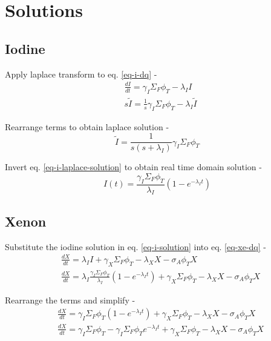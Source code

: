 \documentclass[11pt,a4paper]{article}
\begin{document}
\section{Solutions}
\subsection{Iodine}
\noindent Apply laplace transform to eq. \ref{eq-i-dq} - 
\begin{equation} \label{eq-i-laplace-transform}
    \begin{split}
        & \frac{dI}{dt}=\gamma_I \Sigma_F \phi_T-\lambda_I I \\
        & s\tilde{I}=\frac{1}{s}\gamma_I\Sigma_F\phi_T-\lambda_I\tilde{I}
    \end{split}
\end{equation}
\vspace{\baselineskip}

\noindent Rearrange terms to obtain laplace solution - 
\begin{equation} \label{eq-i-laplace-solution}
    \tilde{I}=\frac{1}{s(s+\lambda_I)}\gamma_I\Sigma_F\phi_T
\end{equation}
\vspace{\baselineskip}

\noindent Invert eq. \ref{eq-i-laplace-solution} to obtain real time domain solution - 
\begin{equation} \label{eq-i-solution}
    I(t)=\frac{\gamma_I\Sigma_F\phi_T}{\lambda_I}(1-e^{-\lambda_I t})
\end{equation}

\subsection{Xenon}
\noindent Substitute the iodine solution in eq. \ref{eq-i-solution} into eq. \ref{eq-xe-dq} - 
\begin{equation} 
    \begin{split}
        & \frac{dX}{dt}=\lambda_I I + \gamma_X \Sigma_F \phi_T - \lambda_X X - \sigma_A \phi_T X \\
        & \frac{dX}{dt}=\lambda_I \frac{\gamma_I\Sigma_F\phi_T}{\lambda_I}(1-e^{-\lambda_I t}) + \gamma_X \Sigma_F \phi_T - \lambda_X X - \sigma_A \phi_T X
    \end{split}
\end{equation}
\vspace{\baselineskip}

\noindent Rearrange the terms and simplify - 
\begin{equation} 
    \begin{split}
        & \frac{dX}{dt}=\gamma_I\Sigma_F\phi_T(1-e^{-\lambda_I t}) + \gamma_X \Sigma_F \phi_T - \lambda_X X - \sigma_A \phi_T X \\
        & \frac{dX}{dt}=\gamma_I\Sigma_F\phi_T - \gamma_I\Sigma_F\phi_T e^{-\lambda_I t} + \gamma_X \Sigma_F \phi_T - \lambda_X X - \sigma_A \phi_T X 
    \end{split}
\end{equation}
\vspace{\baselineskip}
\end{document}
